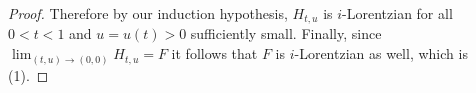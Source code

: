 \documentclass[unnumsec,webpdf,modern,medium]{oup-authoring-template}
\newcommand{\R}{\mathbb{R}}
\theoremstyle{theorem}
\theoremstyle{definition}
\begin{document}
\begin{proof}
	Therefore by our induction hypothesis, $H_{t,u}$ is $i$-Lorentzian for all $0<t<1$ and $u=u(t)>0$ sufficiently small.  Finally, since $\lim_{(t,u)\to (0,0)}H_{t,u}=F$ it follows that $F$ is $i$-Lorentzian as well, which is (1).
\end{proof}


\end{document}
